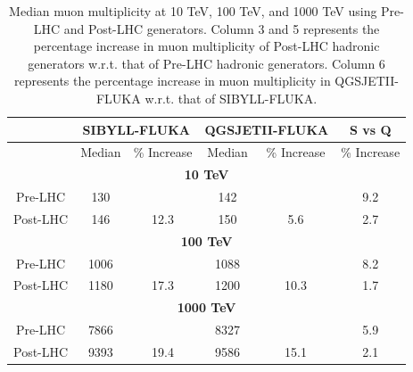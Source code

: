 \documentclass[12pt]{article}
\begin{document}
\begin{table}
\centering
\begin{tabular}{ | c | c | c | c | c | c |} 
\hline
& \multicolumn{2}{|c|}{\textbf{SIBYLL-FLUKA}} & \multicolumn{2}{|c|}{\textbf{QGSJETII-FLUKA}} & S vs Q \\
\hline
 & Median & \% Increase & Median & \% Increase & \% Increase \\
\hline 
\multicolumn{6}{|c|}{\textbf{10 TeV}} \\
\hline
Pre-LHC 	&	130	&	      & 142 &			& 9.2 \\
\hline
Post-LHC 	&	146	&	12.3      & 150 &	5.6		& 2.7 \\
\hline
\multicolumn{6}{|c|}{\textbf{100 TeV}} \\
\hline
Pre-LHC & 1006 &  & 1088 & & 8.2 \\
\hline
Post-LHC & 1180 & 17.3 & 1200 & 10.3 & 1.7 \\
\hline
\multicolumn{6}{|c|}{\textbf{1000 TeV}} \\
\hline
Pre-LHC & 7866 &  & 8327 & & 5.9\\
\hline
Post-LHC & 9393 & 19.4 & 9586 & 15.1 & 2.1\\
\hline
\end{tabular}
\caption{Median muon multiplicity at 10 TeV, 100 TeV, and 1000 TeV using Pre-LHC and Post-LHC generators. Column 3 and 5 represents the percentage increase in muon multiplicity of Post-LHC hadronic generators w.r.t. that of Pre-LHC hadronic generators. Column 6 represents the percentage increase in muon multiplicity in QGSJETII-FLUKA w.r.t. that of SIBYLL-FLUKA.\label{tab:muon_multiplicity_lhc}}
\end{table}
\end{document}
